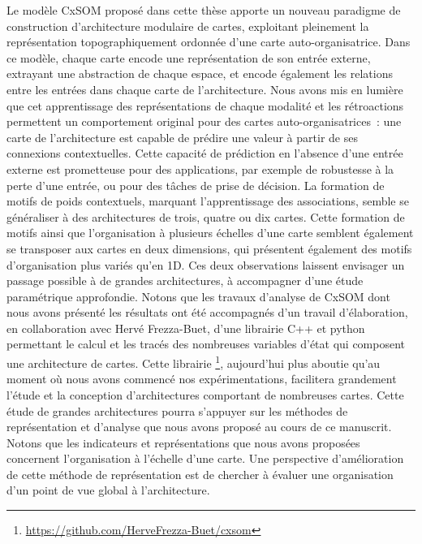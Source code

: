 Le modèle CxSOM proposé dans cette thèse apporte un nouveau paradigme de construction d'architecture modulaire de cartes, exploitant pleinement la représentation topographiquement ordonnée d'une carte auto-organisatrice.
Dans ce modèle, chaque carte encode une représentation de son entrée externe, extrayant une abstraction de chaque espace, et encode également les relations entre les entrées dans chaque carte de l'architecture. 
Nous avons mis en lumière que cet apprentissage des représentations de chaque modalité et les rétroactions permettent un comportement original pour des cartes auto-organisatrices~: une carte de l'architecture est capable de prédire une valeur à partir de ses connexions contextuelles. Cette capacité de prédiction en l'absence d'une entrée externe est prometteuse pour des applications, par exemple de robustesse à la perte d'une entrée, ou pour des tâches de prise de décision.
La formation de motifs de poids contextuels, marquant l'apprentissage des associations, semble se généraliser à des architectures de trois, quatre ou dix cartes.
Cette formation de motifs ainsi que l'organisation à plusieurs échelles d'une carte semblent également se transposer aux cartes en deux dimensions, qui présentent également des motifs d'organisation plus variés qu'en 1D.
Ces deux observations laissent envisager un passage possible à de grandes architectures, à accompagner d'une étude paramétrique approfondie.
Notons que les travaux d'analyse de CxSOM dont nous avons présenté les résultats ont été accompagnés d'un travail d'élaboration, en collaboration avec Hervé Frezza-Buet, d'une librairie C++ et python permettant le calcul et les tracés des nombreuses variables d'état qui composent une architecture de cartes.
Cette librairie \footnote{\url{https://github.com/HerveFrezza-Buet/cxsom}}, aujourd'hui plus aboutie qu'au moment où nous avons commencé nos expérimentations, facilitera grandement l'étude et la conception d'architectures comportant de nombreuses cartes.
Cette étude de grandes architectures pourra s'appuyer sur les méthodes de représentation et d'analyse que nous avons proposé au cours de ce manuscrit. Notons que les indicateurs et représentations que nous avons proposées concernent l'organisation à l'échelle d'une carte. Une perspective d'amélioration de cette méthode de représentation est de chercher à évaluer une organisation d'un point de vue global à l'architecture.

